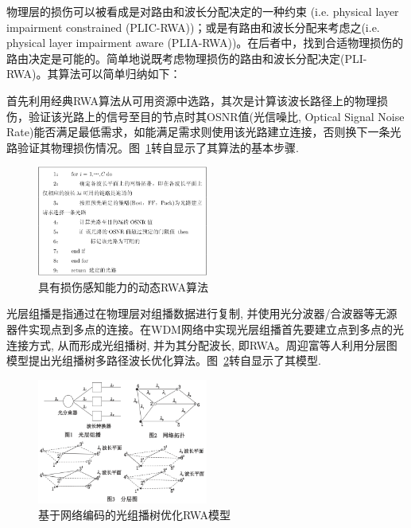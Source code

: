 \documentclass[11pt,twocolumn]{ctexart}
\begin{document}
物理层的损伤可以被看成是对路由和波长分配决定的一种约束 (i.e. physical layer impairment constrained (PLIC-RWA))；或是有路由和波长分配来考虑之(i.e. physical layer impairment aware (PLIA-RWA))。在后者中，找到合适物理损伤的路由决定是可能的。简单地说既考虑物理损伤的路由和波长分配决定(PLI-RWA)。其算法可以简单归纳如下：

首先利用经典RWA算法从可用资源中选路，其次是计算该波长路径上的物理损伤，验证该光路上的信号至目的节点时其OSNR值(光信噪比, Optical Signal Noise Rate)能否满足最低需求，如能满足需求则使用该光路建立连接，否则换下一条光路验证其物理损伤情况。图~\ref{IRWA}转自\cite{8}显示了其算法的基本步骤.
\begin{figure}[!hbtp]
  \begin{center}
  \includegraphics[width=0.5\textwidth]{IRWA}
  \end{center}
  \caption{具有损伤感知能力的动态RWA算法}
  \label{IRWA}
\end{figure}


光层组播是指通过在物理层对组播数据进行复制, 并使用光分波器/合波器等无源器件实现点到多点的连接。在WDM网络中实现光层组播首先要建立点到多点的光连接方式, 从而形成光组播树, 并为其分配波长, 即RWA。周迎富等人利用分层图模型提出光组播树多路径波长优化算法。图~\ref{MT}转自\cite{8}显示了其模型.
\begin{figure}[!hbtp]
  \begin{center}
  \includegraphics[width=0.5\textwidth]{MT}
  \end{center}
  \caption{基于网络编码的光组播树优化RWA模型}
  \label{MT}
\end{figure}
\end{document}
